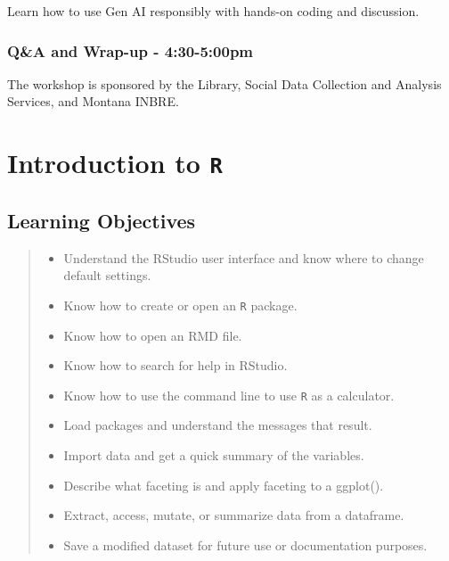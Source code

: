 \documentclass[
  10pt,
  letterpaper,
  twoside,
  openright]{book}
\providecommand{\tightlist}{%
  \setlength{\itemsep}{0pt}\setlength{\parskip}{0pt}}
\begin{document}
Learn how to use Gen AI responsibly with hands-on coding and discussion.

\hypertarget{qa-and-wrap-up---430-500pm}{%
\subsection*{Q\&A and Wrap-up -
4:30-5:00pm}\label{qa-and-wrap-up---430-500pm}}

The workshop is sponsored by the Library, Social Data Collection and
Analysis Services, and Montana INBRE.

\newpage

\hypertarget{introduction-to-r}{%
\chapter{\texorpdfstring{Introduction to
\texttt{R}}{Introduction to R}}\label{introduction-to-r}}

\hypertarget{learning-objectives}{%
\section{Learning Objectives}\label{learning-objectives}}

\begin{quote}
\begin{itemize}
\tightlist
\item
  Understand the RStudio user interface and know where to change default
  settings.
\item
  Know how to create or open an \texttt{R} package.
\item
  Know how to open an RMD file.
\item
  Know how to search for help in RStudio.
\item
  Know how to use the command line to use \texttt{R} as a calculator.
\item
  Load packages and understand the messages that result.
\item
  Import data and get a quick summary of the variables.
\item
  Describe what faceting is and apply faceting to a ggplot().
\item
  Extract, access, mutate, or summarize data from a dataframe.
\item
  Save a modified dataset for future use or documentation purposes.
\end{itemize}
\end{quote}
\end{document}
